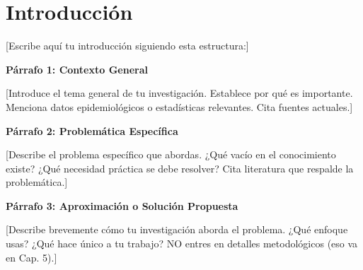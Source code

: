 % 

\chapter{Introducción}
\label{cap:introduccion}

\justifying
\setlength{\parskip}{0pt}

%

\noindent 
{[Escribe aquí tu introducción siguiendo esta estructura:]}

\textbf{Párrafo 1: Contexto General}

{[Introduce el tema general de tu investigación. Establece por qué es importante. Menciona datos epidemiológicos o estadísticas relevantes. Cita fuentes actuales.]}

\textbf{Párrafo 2: Problemática Específica}

{[Describe el problema específico que abordas. ¿Qué vacío en el conocimiento existe? ¿Qué necesidad práctica se debe resolver? Cita literatura que respalde la problemática.]}

\textbf{Párrafo 3: Aproximación o Solución Propuesta}

{[Describe brevemente cómo tu investigación aborda el problema. ¿Qué enfoque usas? ¿Qué hace único a tu trabajo? NO entres en detalles metodológicos (eso va en Cap. 5).]}

